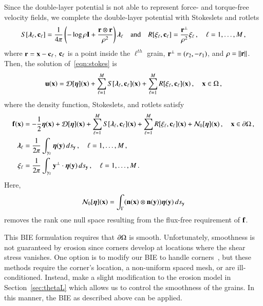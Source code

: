 \documentclass[preprint, 10pt]{elsarticle}
\begin{document}
Since the double-layer potential is not able to represent force- and torque-free velocity fields,  we complete the double-layer potential with Stokeslets and rotlets~\cite{pow-mir1987, pow1993}
\begin{align}
  S[{\boldsymbol\lambda}_\ell,{\mathbf{c}}_\ell] = \frac{1}{4\pi} \left(-\log \rho {\mathbf{I}} + 
    \frac{{\mathbf{r}} \otimes {\mathbf{r}}}{\rho^2} \right){\boldsymbol\lambda}_\ell
  \quad \text{and} \quad
  R[\xi_\ell,{\mathbf{c}}_\ell] = \frac{{\mathbf{r}}^\perp}{\rho^2}\xi_\ell\, , 
  \quad \ell=1,\ldots,M \, ,
  \label{eqn:stokeslet_rotlet}
\end{align}
where  ${\mathbf{r}} = {\mathbf{x}} - {\mathbf{c}}_\ell$, ${\mathbf{c}}_\ell$ is a point inside the $\ell^{th}$ grain, ${\mathbf{r}}^\perp = (r_2,-r_1)$, and $\rho = \|{\mathbf{r}}\|$.  Then, the solution of~\eqref{eqn:stokes} is
\begin{align}
  \label{eqn:completed_DLP}
  {\mathbf{u}}({\mathbf{x}}) = {\mathcal{D}}[{\boldsymbol\eta}]({\mathbf{x}}) + 
    \sum_{\ell=1}^{M} S[{\boldsymbol\lambda}_\ell,{\mathbf{c}}_\ell]({\mathbf{x}}) +
    \sum_{\ell=1}^{M} R[\xi_\ell,{\mathbf{c}}_\ell]({\mathbf{x}})\, , \quad {\mathbf{x}} \in \Omega \, ,
\end{align}
where the density function, Stokeslets, and rotlets satisfy
\begin{subequations}
\label{eqn:completed_BIE}
\begin{align}
  {\mathbf{f}}({\mathbf{x}}) &= -\frac{1}{2}{\boldsymbol\eta}({\mathbf{x}}) + {\mathcal{D}}[{\boldsymbol\eta}]({\mathbf{x}}) + 
      \sum_{\ell=1}^{M} S[{\boldsymbol\lambda}_\ell,{\mathbf{c}}_\ell]({\mathbf{x}}) +
      \sum_{\ell=1}^{M} R[\xi_\ell,{\mathbf{c}}_\ell]({\mathbf{x}}) + {\mathcal{N}}_0[{\boldsymbol\eta}]({\mathbf{x}})\, ,
      \quad {\mathbf{x}} \in {\partial}\Omega \, , 
      \label{eqn:DLP}\\
  {\boldsymbol\lambda}_\ell &= \frac{1}{2\pi}\int_{\gamma_\ell} {\boldsymbol\eta}({\mathbf{y}}) \,
  ds_{\mathbf{y}}\, ,
  \quad \ell=1,\ldots,M \, ,
  \label{eqn:stokeslet} \\
  \xi_\ell &= \frac{1}{2\pi}\int_{\gamma_\ell} {\mathbf{y}}^\perp \cdot {\boldsymbol\eta}({\mathbf{y}})
  \, ds_{\mathbf{y}}\, , \quad \ell=1,\ldots,M \, .
  \label{eqn:rotlet}
\end{align}
\end{subequations}
Here,
\begin{align}
  {\mathcal{N}}_0[{\boldsymbol\eta}]({\mathbf{x}}) = \int_{\Gamma} 
    ({\mathbf{n}}({\mathbf{x}}) \otimes {\mathbf{n}}({\mathbf{y}})){\boldsymbol\eta}({\mathbf{y}}) \, ds_{\mathbf{y}}
\end{align}
removes the rank one null space resulting from the flux-free requirement of ${\mathbf{f}}$.

This BIE formulation requires that ${\partial}\Omega$ is smooth.  Unfortunately, smoothness is not guaranteed by erosion since corners develop at locations where the shear stress vanishes.  One option is to modify our BIE to handle corners~\cite{rac-ser2017, ser-rok2016, hel2011, gil-hao-mar2014, bre2012}, but these methods require the corner's location, a non-uniform spaced mesh, or are ill-conditioned.  Instead, make a slight modification to the erosion model in Section~\ref{sec:thetaL} which allows us to control the smoothness of the grains.  In this manner, the BIE as described above can be applied.
\end{document}
